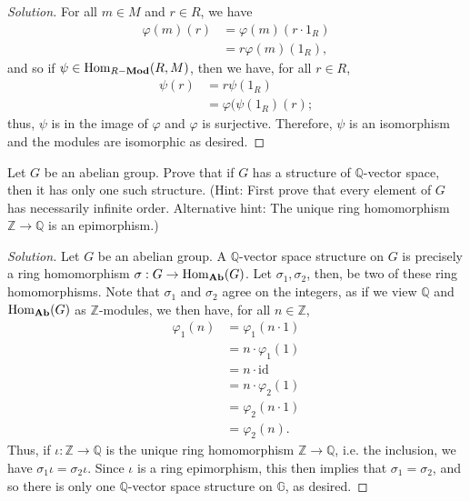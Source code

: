 \documentclass[12pt]{article}
\newenvironment{problem}[2][Problem]{\begin{trivlist}
\item[\hskip \labelsep {\bfseries #1}\hskip \labelsep {\bfseries #2.}]}{\end{trivlist}}
\newcommand{\catname}[1]{\normalfont\textbf{#1}}
\newcommand{\Hom}{\text{Hom}}
\newcommand{\Homc}[2]{\Hom_{\catname{#1}}(#2)}
\newcommand{\Homod}[2]{\Hom_{#1-\catname{Mod}}(#2)}
\newcommand{\id}{\text{id}}
\newenvironment{solution}
  {\renewcommand\qedsymbol{$\blacksquare$}\begin{proof}[Solution]}
{\end{proof}}
\theoremstyle{remark}
\begin{document}
\begin{solution}
  For all $m\in M$ and $r\in R$, we have
  \begin{align*}
    \varphi(m)(r) &= \varphi(m)(r\cdot1_R) \\
    &=r\varphi(m)(1_R),
  \end{align*}
  and so if $\psi\in\Homod{R}{R,M}$, then we have, for all $r\in R$,
  \begin{align*}
    \psi(r) &= r\psi(1_R)\\
    &= \varphi(\psi(1_R)(r);
  \end{align*}
  thus, $\psi$ is in the image of $\varphi$ and $\varphi$ is surjective.
  Therefore, $\psi$ is an isomorphism and the modules are isomorphic as desired.
\end{solution}

\begin{problem}{5.6}
  Let $G$ be an abelian group.
  Prove that if $G$ has a structure of $\mathbb{Q}$-vector space, then it has only one such structure.
  (Hint: First prove that every element of $G$ has necessarily infinite order.
  Alternative hint: The unique ring homomorphism $\mathbb{Z}\to\mathbb{Q}$ is an epimorphism.)
\end{problem}
\begin{solution}
  Let $G$ be an abelian group.
  A $\mathbb{Q}$-vector space structure on $G$ is precisely a ring homomorphism
  $\sigma:G\to\Homc{Ab}{G}$.
  Let $\sigma_1,\sigma_2$, then, be two of these ring homomorphisms.
  Note that $\sigma_1$ and $\sigma_2$ agree on the integers, as if we view $\mathbb{Q}$ and
  $\Homc{Ab}{G}$ as $\mathbb{Z}$-modules, we then have, for all $n\in\mathbb{Z}$,
  \begin{align*}
    \varphi_1(n) &= \varphi_1(n\cdot1) \\
    &= n\cdot\varphi_1(1)\\
    &= n\cdot\id\\
    &= n\cdot\varphi_2(1)\\
    &= \varphi_2(n\cdot1) \\
    &= \varphi_2(n).
  \end{align*}
  Thus, if $\iota:\mathbb{Z}\to\mathbb{Q}$ is the unique ring homomorphism $\mathbb{Z}\to\mathbb{Q}$,
  i.e. the inclusion, we have $\sigma_1\iota = \sigma_2\iota$.
  Since $\iota$ is a ring epimorphism, this then implies that $\sigma_1=\sigma_2$, and so
  there is only one $\mathbb{Q}$-vector space structure on $\mathbb{G}$, as desired.
\end{solution}

\newpage
\end{document}
